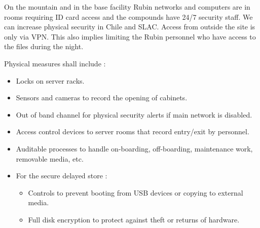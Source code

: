On the mountain and in the base facility Rubin networks and computers are in rooms requiring ID card access and the compounds have 24/7 security staff. We can increase physical security in Chile and SLAC.
Access from outside the site is only via VPN.
This also implies limiting the Rubin personnel who have access to the files during the night.


 {
Physical measures shall include :
\begin{itemize}
\item Locks on server racks.
\item Sensors and cameras to record the opening of cabinets.
\item Out of band channel for physical security alerts if main network is disabled.
\item Access control devices to server rooms that record entry/exit by personnel.
\item Auditable processes to handle on-boarding, off-boarding, maintenance work, removable media, etc.
\item For the secure delayed store :
	\begin{itemize}
	\item Controls to prevent booting from USB devices or copying to external media.
	\item Full disk encryption to protect against theft or returns of hardware.
	\end{itemize}
\end{itemize}

}




